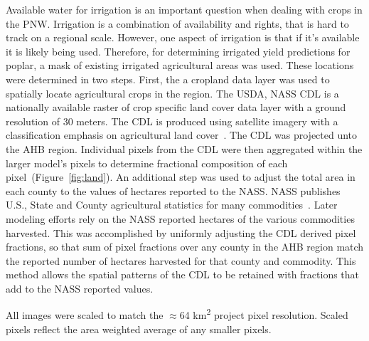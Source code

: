 \documentclass[preprint,review,12pt]{elsarticle}
\begin{document}


Available water for irrigation is an important question when dealing
with crops in the \ac{PNW}.  Irrigation is a combination of
availability and rights, that is hard to track on a regional scale.
However, one aspect of irrigation is that if it's available it is
likely being used.  Therefore, for determining irrigated yield
predictions for poplar, a mask of existing irrigated agricultural
areas was used.  These locations were determined in two steps.  First,
the a cropland data layer was used to spatially locate agricultural
crops in the region.  The USDA, \ac{NASS} \ac{CDL} is a
nationally available raster of crop specific land cover data layer
with a ground resolution of 30 meters.  The CDL is produced using
satellite imagery with a classification emphasis on agricultural land
cover~\cite{Boryan2011a}.  The CDL was projected unto the \ac{AHB}
region.  Individual pixels from the CDL were then aggregated within
the larger model's pixels to determine fractional composition of each
pixel~(Figure~\ref{fig:land}).  An additional step was used to adjust
the total area in each county to the values of hectares reported to
the \ac{NASS}.  \ac{NASS} publishes U.S., State and County
agricultural statistics for many commodities~\cite{Service2015}.
Later modeling efforts rely on the \ac{NASS} reported hectares of the
various commodities harvested.  This was accomplished by uniformly
adjusting the CDL derived pixel fractions, so that sum of pixel
fractions over any county in the \ac{AHB} region match the reported
number of hectares harvested for that county and commodity.  This
method allows the spatial patterns of the CDL to be retained with
fractions that add to the \ac{NASS} reported values.

All images were scaled to match the $\approx$64 km\textsuperscript{2}
project pixel resolution. Scaled pixels reflect the area weighted
average of any smaller pixels.
\end{document}
